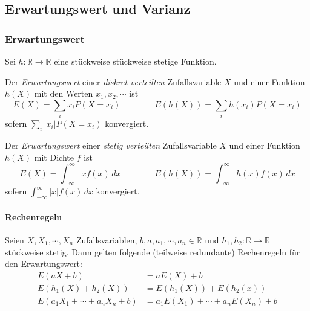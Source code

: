 \documentclass[a4paper, 11pt, accentcolor = tud3b]{tudreport}
\newcommand{\abs}[1]{\ensuremath{{\lvert #1 \rvert}}}
\newcommand{\R}{\ensuremath{\mathbb{R}}}
\begin{document}
            \subsection{Erwartungswert und Varianz}
                \subsubsection{Erwartungswert}
	                Sei \( h : \R \rightarrow \R \) eine stückweise stückweise stetige Funktion.
                
                    Der \textit{Erwartungswert} einer \textit{diskret verteilten} Zufallsvariable \(X\) und einer Funktion \( h(X) \) mit den Werten \( x_1, x_2, \cdots \) ist
                    \begin{equation*}
	                    E(X) = \sum_{i} x_i P(X = x_i) \qquad\qquad E(h(X)) = \sum_i h(x_i) P(X = x_i)
                    \end{equation*}
                    sofern \( \sum_i \abs{x_i} P(X = x_i) \) konvergiert.
                    
                    Der \textit{Erwartungswert} einer \textit{stetig verteilten} Zufallsvariable \(X\) und einer Funktion \( h(X) \) mit Dichte \(f\) ist
                    \begin{equation*}
	                    E(X) = \int_{-\infty}^{\infty} \! x f(x) \, dx \qquad\qquad E(h(X)) = \int_{-\infty}^{\infty} \! h(x) f(x) \, dx
                    \end{equation*}
                    sofern \( \int_{-\infty}^{\infty} \! \abs{x} f(x) \, dx \) konvergiert.

                    \paragraph{Rechenregeln}
	                    Seien \(X, X_1, \cdots, X_n\) Zufallsvariablen, \( b, a, a_1, \cdots, a_n \in \R \) und \( h_1, h_2 : \R \rightarrow \R \) stückweise stetig. Dann gelten folgende (teilweise redundante) Rechenregeln für den Erwartungswert:
	                    \begin{align*}
	                    	E(aX + b)                       & = aE(X) + b                          \\
	                    	E(h_1(X) + h_2(X))              & = E(h_1(X)) + E(h_2(x))              \\
	                    	E(a_1X_1 + \cdots + a_nX_n + b) & = a_1E(X_1) + \cdots + a_nE(X_n) + b
	                    \end{align*}
\end{document}
